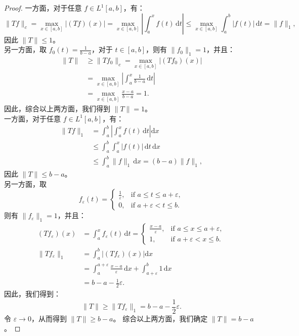 \documentclass[lang=cn,newtx,10pt,scheme=chinese,thmcnt=chapter]{elegantbook}
\newcommand{\dif}{\mathrm{d}}
\begin{document}
\begin{proof}
		 一方面，对于任意 $f \in L^1[a, b]$，有：
\[
\|T f\|_c = \max_{x \in [a, b]} |(T f)(x)| = \max_{x \in [a, b]} \left| \int_a^x f(t) \, \dif t \right| 
\leqslant \max_{x \in [a, b]}\int_a^b |f(t)| \, \dif t = \|f\|_1,
\]
因此 $\|T\| \leqslant 1$。
\\ 另一方面，取 $f_0(t) = \frac{1}{b-a}$，对于 $t \in [a, b]$，则有 $\|f_0\|_1 = 1$，并且：
\[
\begin{aligned}
	\|T\| & \geqslant \|T f_0\|_c = \max_{x \in [a, b]} |(T f_0)(x)| \\
	& = \max_{x \in [a, b]} \left|\int_a^x \frac{1}{b-a} \, \dif t\right| \\
	& = \max_{x \in [a, b]} \frac{x-a}{b-a} = 1.
\end{aligned}
\]
因此，综合以上两方面，我们得到 $\|T\| = 1$。\\
一方面，对于任意 $f \in L^1[a, b]$，有：
\[
\begin{aligned}
	\|T f\|_1 & = \int_a^b \left| \int_a^x f(t) \, \dif t \right| \dif x \\
	& \leqslant \int_a^b \int_a^x |f(t)| \, \dif t \, \dif x \\
	& \leqslant \int_a^b \|f\|_1 \, \dif x = (b - a) \|f\|_1,
\end{aligned}
\]
因此 $\|T\| \leqslant b - a$。\\另一方面，取
\[
f_{\varepsilon}(t) =
\begin{cases}
	\frac{1}{\varepsilon}, & \text{if } a \leq t \leq a + \varepsilon, \\
	0, & \text{if } a + \varepsilon < t \leq b.
\end{cases}
\]
则有 $\|f_{\varepsilon}\|_1 = 1$，并且：
\[
\begin{aligned}
	(T f_{\varepsilon})(x) &= \int_a^x f_{\varepsilon}(t) \, \dif t = 
	\begin{cases}
		\frac{x - a}{\varepsilon}, & \text{if } a \leq x \leq a + \varepsilon, \\
		1, & \text{if } a + \varepsilon < x \leq b.
	\end{cases} \\
	\|T f_{\varepsilon}\|_1 &= \int_a^b \left| (T f_{\varepsilon})(x) \right| \dif x \\
	& = \int_a^{a+\varepsilon} \frac{x - a}{\varepsilon} \, \dif x + \int_{a+\varepsilon}^b 1 \, \dif x \\
	& = b - a - \frac{1}{2} \varepsilon.
\end{aligned}
\]
因此，我们得到：
\[
\|T\| \geqslant \|T f_{\varepsilon}\|_1 = b - a - \frac{1}{2} \varepsilon.
\]
令 $\varepsilon \to 0$，从而得到 $\|T\| \geqslant b - a$。
综合以上两方面，我们确定 $\|T\| = b - a$。
\end{proof}
\end{document}
